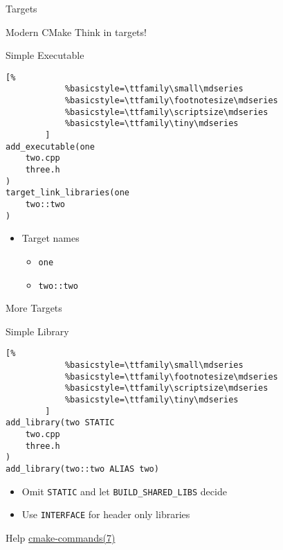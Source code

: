 \documentclass[t]{beamer}
\begin{document}
\begin{frame}[fragile]{Targets}
    \begin{alertblock}{Modern CMake}
        Think in targets!
    \end{alertblock}

    \pause

    \begin{block}{Simple Executable}
        \begin{lstlisting}[%
            %basicstyle=\ttfamily\small\mdseries
            %basicstyle=\ttfamily\footnotesize\mdseries
            %basicstyle=\ttfamily\scriptsize\mdseries
            %basicstyle=\ttfamily\tiny\mdseries
        ]
add_executable(one
    two.cpp
    three.h
)
target_link_libraries(one
    two::two
)
        \end{lstlisting}
    \end{block}

    \begin{itemize}
        \item Target names
            \begin{itemize}
                \item \texttt{one}
                \item \texttt{two::two}
            \end{itemize}
    \end{itemize}
\end{frame}

\begin{frame}[fragile]{More Targets}
    \begin{block}{Simple Library}
        \begin{lstlisting}[%
            %basicstyle=\ttfamily\small\mdseries
            %basicstyle=\ttfamily\footnotesize\mdseries
            %basicstyle=\ttfamily\scriptsize\mdseries
            %basicstyle=\ttfamily\tiny\mdseries
        ]
add_library(two STATIC
    two.cpp
    three.h
)
add_library(two::two ALIAS two)
        \end{lstlisting}

        \begin{itemize}
            \item Omit \texttt{STATIC} and let \texttt{BUILD\_SHARED\_LIBS}
                decide
            \item Use \texttt{INTERFACE} for header only libraries
        \end{itemize}
    \end{block}

    \begin{block}{Help}
        \href{https://cmake.org/cmake/help/latest/manual/cmake-commands.7.html}{cmake-commands(7)}
    \end{block}
\end{frame}
\end{document}
